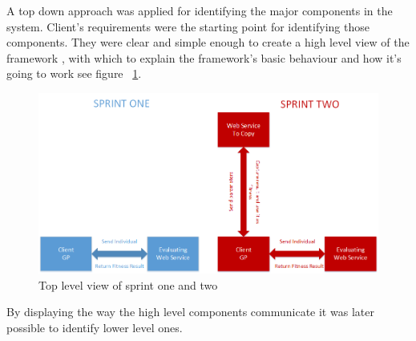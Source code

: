 A top down approach was applied for identifying the major components in the system. Client's requirements were the starting point for identifying those components. They were
clear and simple enough to create a high level view of the framework , with which to explain the framework's basic behaviour and how it's going to work see figure ~\ref{fig:sprints}. 

\begin{figure}[htp]
\centering
\includegraphics[scale=0.7]{Figures/sprints.png}
\caption{Top level view of sprint one and two}
\label{fig:sprints}
\end{figure}

By displaying the way the high level components communicate it was later possible to identify lower level ones.
